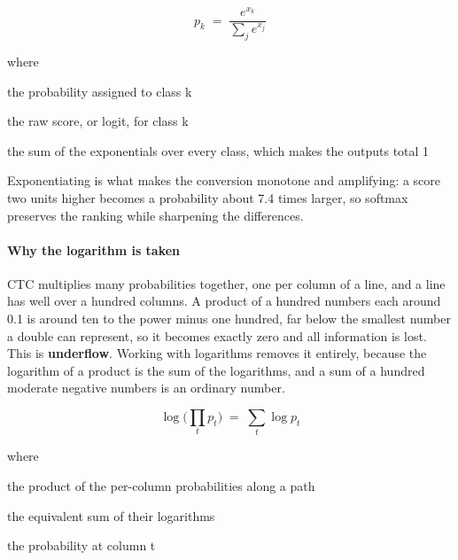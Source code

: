 \begin{equation}
p_{k} \;=\; \frac{e^{x_{k}}}{\sum_{j} e^{x_{j}}}
\end{equation}

\noindent where
\begin{description}[leftmargin=2.4em,style=nextline,font=\normalfont\ttfamily]\setlength\itemsep{1pt}
  \item[{$p_k$}] \normalfont the probability assigned to class k
  \item[{$x_k$}] \normalfont the raw score, or logit, for class k
  \item[{$\sum_{j} e^{x_{j}}$}] \normalfont the sum of the exponentials over every class, which makes the outputs total 1
\end{description}
Exponentiating is what makes the conversion monotone and amplifying: a score two units higher becomes a probability about 7.4 times larger, so softmax preserves the ranking while sharpening the differences.


\paragraph{Why the logarithm is taken}
CTC multiplies many probabilities together, one per column of a line, and a line has well over a hundred columns. A product of a hundred numbers each around 0.1 is around ten to the power minus one hundred, far below the smallest number a double can represent, so it becomes exactly zero and all information is lost. This is \textbf{underflow}. Working with logarithms removes it entirely, because the logarithm of a product is the sum of the logarithms, and a sum of a hundred moderate negative numbers is an ordinary number.


\begin{equation}
\log\!\Big(\prod_{t} p_{t}\Big) \;=\; \sum_{t} \log p_{t}
\end{equation}

\noindent where
\begin{description}[leftmargin=2.4em,style=nextline,font=\normalfont\ttfamily]\setlength\itemsep{1pt}
  \item[{$\prod_{t} p_{t}$}] \normalfont the product of the per-column probabilities along a path
  \item[{$\sum_{t} \log p_{t}$}] \normalfont the equivalent sum of their logarithms
  \item[{$p_t$}] \normalfont the probability at column t
\end{description}

